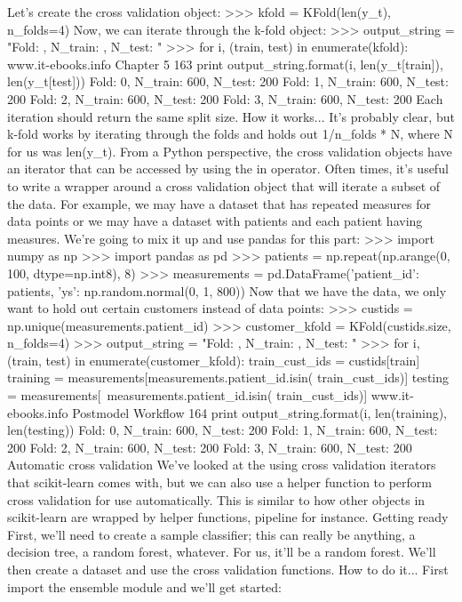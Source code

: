 Let's create the cross validation object:
>>> kfold = KFold(len(y_t), n_folds=4)
Now, we can iterate through the k-fold object:
>>> output_string = "Fold: {}, N_train: {}, N_test: {}"
>>> for i, (train, test) in enumerate(kfold):
www.it-ebooks.info
Chapter 5
163
print output_string.format(i, len(y_t[train]), len(y_t[test]))
Fold: 0, N_train: 600, N_test: 200
Fold: 1, N_train: 600, N_test: 200
Fold: 2, N_train: 600, N_test: 200
Fold: 3, N_train: 600, N_test: 200
Each iteration should return the same split size.
How it works...
It's probably clear, but k-fold works by iterating through the folds and holds out 1/n_folds *
N, where N for us was len(y_t).
From a Python perspective, the cross validation objects have an iterator that can be accessed
by using the in operator. Often times, it's useful to write a wrapper around a cross validation
object that will iterate a subset of the data. For example, we may have a dataset that has
repeated measures for data points or we may have a dataset with patients and each patient
having measures.
We're going to mix it up and use pandas for this part:
>>> import numpy as np
>>> import pandas as pd
>>> patients = np.repeat(np.arange(0, 100, dtype=np.int8), 8)
>>> measurements = pd.DataFrame({'patient_id': patients,
'ys': np.random.normal(0, 1, 800)})
Now that we have the data, we only want to hold out certain customers instead of data points:
>>> custids = np.unique(measurements.patient_id)
>>> customer_kfold = KFold(custids.size, n_folds=4)
>>> output_string = "Fold: {}, N_train: {}, N_test: {}"
>>> for i, (train, test) in enumerate(customer_kfold):
train_cust_ids = custids[train]
training = measurements[measurements.patient_id.isin(
train_cust_ids)]
testing = measurements[~measurements.patient_id.isin(
train_cust_ids)]
www.it-ebooks.info
Postmodel Workflow
164
print output_string.format(i, len(training), len(testing))
Fold: 0, N_train: 600, N_test: 200
Fold: 1, N_train: 600, N_test: 200
Fold: 2, N_train: 600, N_test: 200
Fold: 3, N_train: 600, N_test: 200
Automatic cross validation
We've looked at the using cross validation iterators that scikit-learn comes with, but we can
also use a helper function to perform cross validation for use automatically. This is similar
to how other objects in scikit-learn are wrapped by helper functions, pipeline for instance.
Getting ready
First, we'll need to create a sample classifier; this can really be anything, a decision tree,
a random forest, whatever. For us, it'll be a random forest. We'll then create a dataset
and use the cross validation functions.
How to do it...
First import the ensemble module and we'll get started:
